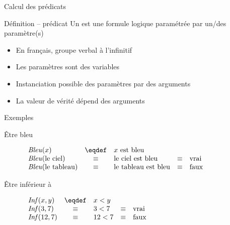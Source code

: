 
\begingroup

\begin{frame}{Calcul des prédicats}
  \begin{block}{Définition -- prédicat}
    Un  est une \alert{formule logique paramétrée par un/des paramètre(s)} 
    \begin{itemize}
    \item En français, groupe verbal à l'infinitif 
    \item Les paramètres sont des variables 
    \item Instanciation possible des paramètres par des \alert{arguments}
    \item La \alert{valeur de vérité} dépend des arguments
    \end{itemize}
  \end{block}
  \begin{exampleblock}{Exemples}
    \begin{description}
    \item [Être bleu] $ \begin{array}[t]{lclcl}
      \mathit{Bleu}(x) &\eqdef& x \text{ est bleu}&&\\
      \mathit{Bleu}(\text{le ciel}) &\equiv& \text{le ciel est bleu} &\equiv& \text{vrai} \\
      \mathit{Bleu}(\text{le tableau}) &\equiv& \text{le tableau est bleu} &\equiv& \text{faux}
    \end{array}$
    \item [Être inférieur à] $\begin{array}[t]{lclcl}
      \mathit{Inf}(x, y)  &\eqdef& x < y &&\\
      \mathit{Inf}(3, 7)  &\equiv& 3 < 7  &\equiv& \text{vrai} \\
      \mathit{Inf}(12, 7) &\equiv& 12 < 7 &\equiv& \text{faux}
    \end{array}$
    \end{description}
  \end{exampleblock}  
  
\end{frame}


\endgroup
